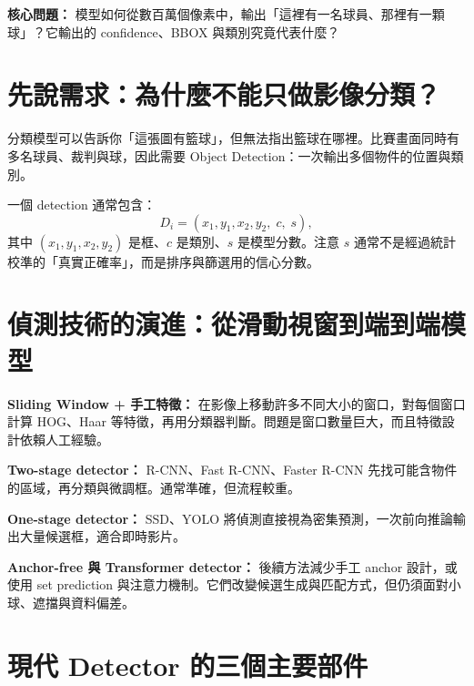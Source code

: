 \documentclass[11pt,a4paper,oneside]{report}
\begin{document}
\begin{heroBox}
\textbf{核心問題：}\quad
模型如何從數百萬個像素中，輸出「這裡有一名球員、那裡有一顆球」？它輸出的 confidence、BBOX 與類別究竟代表什麼？
\end{heroBox}

\section{先說需求：為什麼不能只做影像分類？}

\begin{conceptBox}
分類模型可以告訴你「這張圖有籃球」，但無法指出籃球在哪裡。比賽畫面同時有多名球員、裁判與球，因此需要 Object Detection：一次輸出多個物件的位置與類別。
\end{conceptBox}

一個 detection 通常包含：
\[
D_i=(x_1,y_1,x_2,y_2,\;c,\;s),
\]
其中 $(x_1,y_1,x_2,y_2)$ 是框、$c$ 是類別、$s$ 是模型分數。注意 $s$ 通常不是經過統計校準的「真實正確率」，而是排序與篩選用的信心分數。

\section{偵測技術的演進：從滑動視窗到端到端模型}

\begin{historyBox}
\textbf{Sliding Window + 手工特徵：}\quad
在影像上移動許多不同大小的窗口，對每個窗口計算 HOG、Haar 等特徵，再用分類器判斷。問題是窗口數量巨大，而且特徵設計依賴人工經驗。

\textbf{Two-stage detector：}\quad
R-CNN、Fast R-CNN、Faster R-CNN 先找可能含物件的區域，再分類與微調框。通常準確，但流程較重。

\textbf{One-stage detector：}\quad
SSD、YOLO 將偵測直接視為密集預測，一次前向推論輸出大量候選框，適合即時影片。

\textbf{Anchor-free 與 Transformer detector：}\quad
後續方法減少手工 anchor 設計，或使用 set prediction 與注意力機制。它們改變候選生成與匹配方式，但仍須面對小球、遮擋與資料偏差。
\end{historyBox}

\section{現代 Detector 的三個主要部件}

\begin{center}
\end{center}
\end{document}
